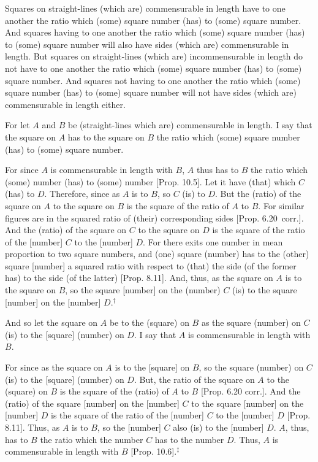 \begin{Parallel}{}{}
{Squares on straight-lines (which are) commensurable in length have to one another the ratio which (some) square number (has) to (some)
square number. And squares having to one another the ratio which (some)
square number (has) to (some) square number will also have sides (which are)
commensurable in length. But squares on straight-lines (which are) incommensurable
in length do not have to one another the ratio which (some) square
number (has) to (some) square number. And squares not having
to one another the ratio which (some) square number (has) to (some)
square number will not have sides (which are) commensurable in length either.

\epsfysize=0.5in
\centerline{}

For let $A$ and $B$ be (straight-lines which are) commensurable in length.
I say that the square on $A$ has to the square on $B$ the ratio
which (some) square number (has) to (some) square number.

For since $A$ is commensurable in length with $B$, $A$ thus
has to $B$ the ratio which (some) number (has) to (some) number [Prop. 10.5]. Let it have (that) which $C$ (has) to $D$.
Therefore, since as $A$ is to $B$, so $C$ (is) to $D$. But the (ratio)
of the square on $A$ to the square on $B$ is the square of the
ratio of $A$ to $B$. For similar figures are in the squared ratio of (their) corresponding sides [Prop. 6.20~corr.].
And the (ratio) of the square on $C$ to the square on $D$ is the
square of the ratio of the [number] $C$ to the [number] $D$.
For there exits one number in mean proportion to two square numbers,
and (one) square (number) has to the (other) square [number] a squared ratio
with respect to (that) the side (of the former has) to the side (of the latter)
[Prop. 8.11]. And, thus,  as the square on $A$
is to the square on $B$, so the square  [number] on the (number) $C$ (is) to
the square [number] on the [number] $D$.$^\dag$

And so let the square on $A$ be to the (square) on $B$ as the
square (number) on $C$ (is) to the [square] (number) on $D$. I say
that $A$ is commensurable in length  with $B$.

For since as the square on $A$ is to the [square] on $B$, so the
square (number) on $C$ (is) to the [square] (number) on $D$. But,
the ratio of the square on $A$ to the (square) on $B$ is the square
of the (ratio) of $A$ to $B$ [Prop. 6.20 corr.].
And the (ratio) of the square [number] on the [number] $C$ to
the square [number] on the [number] $D$ is the square of the ratio
of the [number] $C$ to the [number] $D$ [Prop. 8.11].  Thus, as $A$ is to $B$, so the
[number] $C$ also (is) to the [number] $D$.
$A$, thus,  has to $B$ the ratio
which the number $C$ has to the number $D$. Thus, $A$ is
commensurable in length with $B$ [Prop. 10.6].$^\ddag$

}
\end{Parallel}
